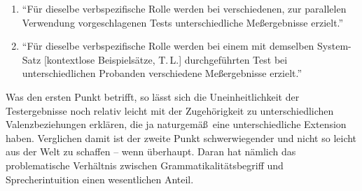 \begin{enumerate}
  \item "`Für dieselbe verbspezifische Rolle werden bei verschiedenen, zur parallelen Verwendung vorgeschlagenen Tests unterschiedliche Me\ss ergebnisse erzielt."'
  \item "`Für dieselbe verbspezifische Rolle werden bei einem mit demselben Sys\-tem-Satz [kontextlose Beispielsätze, T.\,L.] durchgeführten Test bei unterschiedlichen Probanden verschiedene Me\ss ergebnisse erzielt."' 
\end{enumerate}
Was den ersten Punkt betrifft, so lässt sich die Uneinheitlichkeit der Testergebnisse noch relativ leicht mit der Zugehörigkeit zu unterschiedlichen Valenzbeziehungen erklären, die ja naturgemä\ss\ eine unterschiedliche Extension haben. Verglichen damit ist der zweite Punkt schwerwiegender und nicht so leicht aus der Welt zu schaffen -- wenn überhaupt. Daran hat nämlich das problematische Verhältnis zwischen Grammatikalitätsbegriff und Sprecherintuition einen wesentlichen Anteil.

